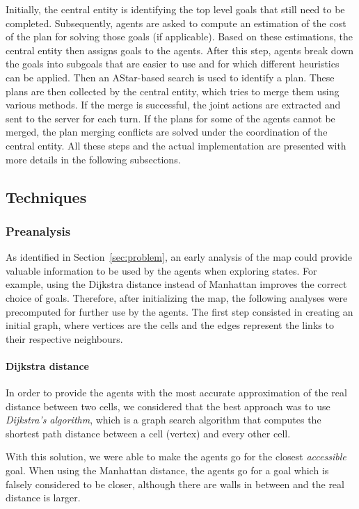 Initially, the central entity is identifying the top level goals that still need to be completed.
Subsequently, agents are asked to compute an estimation of the cost of the plan for solving those goals (if
applicable). Based on these estimations, the central entity then assigns goals to the agents. After this step,
agents break down the goals into subgoals that are easier to use and for which different heuristics can be
applied. Then an AStar-based search is used to identify a plan. These plans are then collected by the central
entity, which tries to merge them using various methods. If the merge is successful, the joint actions are
extracted and sent to the server for each turn. If the plans for some of the agents cannot be merged, the plan
merging conflicts are solved under the coordination of the central entity. All these steps and the actual
implementation are presented with more details in the following subsections.


\subsection{Techniques}

\subsubsection{Preanalysis}
As identified in Section~\ref{sec:problem}, an early analysis of the map could provide valuable information to
be used by the agents when exploring states. For example, using the Dijkstra distance instead of Manhattan
improves the correct choice of goals. Therefore, after initializing the map, the following analyses were
precomputed for further use by the agents. The first step consisted in creating an initial graph, where
vertices are the cells and the edges represent the links to their respective neighbours.

\paragraph{Dijkstra distance}

In order to provide the agents with the most accurate approximation of the real distance between two cells, we
considered that the best approach was to use \textit{Dijkstra's algorithm}, which is a graph search algorithm
that computes the shortest path distance between a cell (vertex) and every other cell.

With this solution, we were able to make the agents go for the closest \textit{accessible} goal. When using
the Manhattan distance, the agents go for a goal which is falsely considered to be closer, although there are
walls in between and the real distance is larger.

